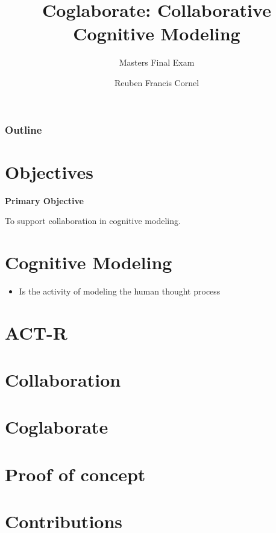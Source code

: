 \documentclass[notes]{beamer}
\title{Coglaborate: Collaborative Cognitive Modeling}
\subtitle{Masters Final Exam}
\author{Reuben Francis Cornel}
\institute{Knowledge Discovery Lab \\ North Carolina State University}
\begin{document}
\begin{frame}
  \titlepage
\end{frame}

\begin{frame}
  \frametitle{Outline}
  \tableofcontents
\end{frame}

\section{Objectives}

\begin{frame}
  
  \textbf{Primary Objective}

  \hspace{2cm} To support collaboration in cognitive modeling.

\end{frame}
\section{Cognitive Modeling}
\begin{frame}
  \begin{itemize}
  \item Is the activity of modeling the human thought process
  \end{itemize}
\end{frame}

\section{ACT-R}

\section{Collaboration}

\section{Coglaborate}

\section{Proof of concept}

\section{Contributions}
\end{document}

